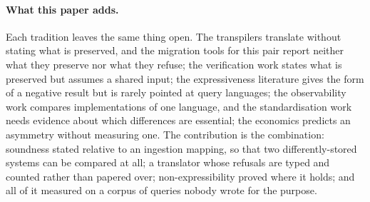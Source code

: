 \paragraph{What this paper adds.}
Each tradition leaves the same thing open. The transpilers translate without stating what
is preserved, and the migration tools for this pair report neither what they preserve nor
what they refuse; the verification work states what is preserved but assumes a shared
input; the expressiveness literature gives the form of a negative result but is rarely
pointed at query languages; the observability work compares implementations of one
language, and the standardisation work needs evidence about which differences are
essential; the economics predicts an asymmetry without measuring one. The contribution is
the combination: soundness stated relative to an ingestion mapping, so that two
differently-stored systems can be compared at all; a translator whose refusals are typed
and counted rather than papered over; non-expressibility proved where it holds; and all of
it measured on a corpus of queries nobody wrote for the purpose.
